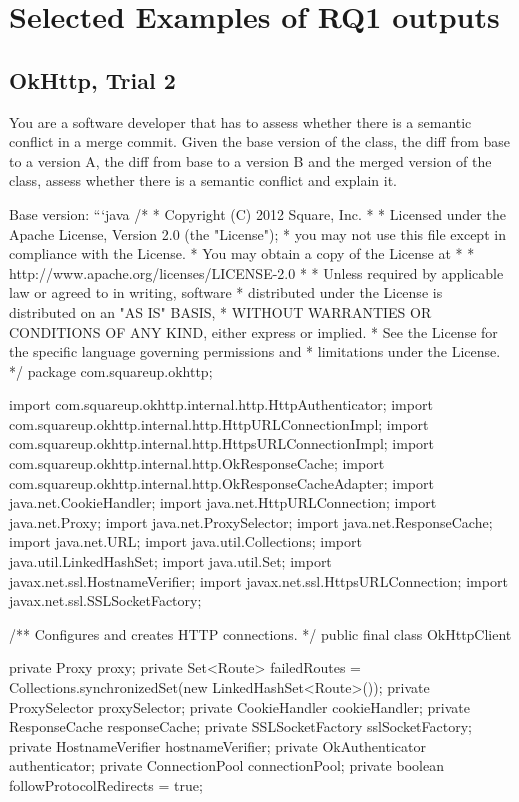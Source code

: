 \section{Selected Examples of RQ1 outputs}

\subsection{OkHttp, Trial 2}

\begin{prompt}
  You are a software developer that has to assess whether there is a semantic conflict in a merge commit.  Given the base version of the class, the diff from base to a version A, the diff from base to a version B and the merged version of the class, assess whether there is a semantic conflict and explain it.

Base version:
```java
/*
 * Copyright (C) 2012 Square, Inc.
 *
 * Licensed under the Apache License, Version 2.0 (the "License");
 * you may not use this file except in compliance with the License.
 * You may obtain a copy of the License at
 *
 *      http://www.apache.org/licenses/LICENSE-2.0
 *
 * Unless required by applicable law or agreed to in writing, software
 * distributed under the License is distributed on an "AS IS" BASIS,
 * WITHOUT WARRANTIES OR CONDITIONS OF ANY KIND, either express or implied.
 * See the License for the specific language governing permissions and
 * limitations under the License.
 */
package com.squareup.okhttp;

import com.squareup.okhttp.internal.http.HttpAuthenticator;
import com.squareup.okhttp.internal.http.HttpURLConnectionImpl;
import com.squareup.okhttp.internal.http.HttpsURLConnectionImpl;
import com.squareup.okhttp.internal.http.OkResponseCache;
import com.squareup.okhttp.internal.http.OkResponseCacheAdapter;
import java.net.CookieHandler;
import java.net.HttpURLConnection;
import java.net.Proxy;
import java.net.ProxySelector;
import java.net.ResponseCache;
import java.net.URL;
import java.util.Collections;
import java.util.LinkedHashSet;
import java.util.Set;
import javax.net.ssl.HostnameVerifier;
import javax.net.ssl.HttpsURLConnection;
import javax.net.ssl.SSLSocketFactory;

/** Configures and creates HTTP connections. */
public final class OkHttpClient {
  private Proxy proxy;
  private Set<Route> failedRoutes = Collections.synchronizedSet(new LinkedHashSet<Route>());
  private ProxySelector proxySelector;
  private CookieHandler cookieHandler;
  private ResponseCache responseCache;
  private SSLSocketFactory sslSocketFactory;
  private HostnameVerifier hostnameVerifier;
  private OkAuthenticator authenticator;
  private ConnectionPool connectionPool;
  private boolean followProtocolRedirects = true;

}
\end{prompt}
